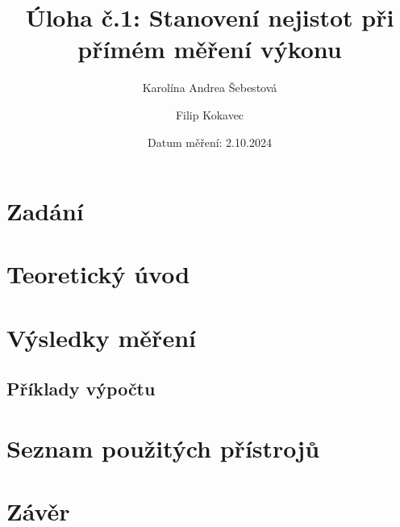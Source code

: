 \documentclass[a4paper, czech]{article}
\title{Úloha č.1: Stanovení nejistot při přímém měření výkonu}
\author{Karolína Andrea Šebestová \and Filip Kokavec}
\date{Datum měření: 2.10.2024}
\begin{document}
\maketitle

\section{Zadání}

\section{Teoretický úvod}

\section{Výsledky měření}

\subsection{Příklady výpočtu}

\section{Seznam použitých přístrojů}

\section{Závěr}
\end{document}
